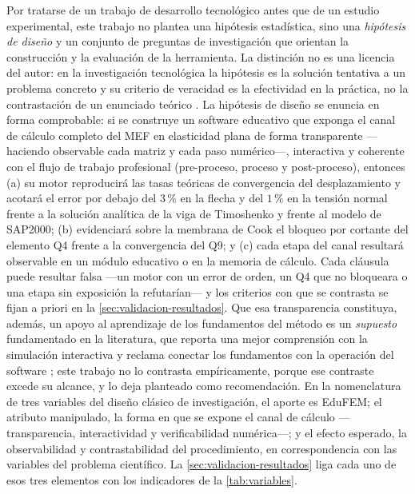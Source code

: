 Por tratarse de un trabajo de desarrollo tecnológico antes que de un estudio experimental, este trabajo no plantea una hipótesis estadística, sino una \emph{hipótesis de diseño} y un conjunto de preguntas de investigación que orientan la construcción y la evaluación de la herramienta. La distinción no es una licencia del autor: en la investigación tecnológica la hipótesis es la solución tentativa a un problema concreto y su criterio de veracidad es la efectividad en la práctica, no la contrastación de un enunciado teórico \autocite[p.~85]{garciacordoba2005tecnologica}. La hipótesis de diseño se enuncia en forma comprobable: si se construye un software educativo que exponga el canal de cálculo completo del MEF en elasticidad plana de forma transparente —haciendo observable cada matriz y cada paso numérico—, interactiva y coherente con el flujo de trabajo profesional (pre-proceso, proceso y post-proceso), entonces (a) su motor reproducirá las tasas teóricas de convergencia del desplazamiento y acotará el error por debajo del $3\,\%$ en la flecha y del $1\,\%$ en la tensión normal frente a la solución analítica de la viga de Timoshenko y frente al modelo de SAP2000; (b) evidenciará sobre la membrana de Cook el bloqueo por cortante del elemento Q4 frente a la convergencia del Q9; y (c) cada etapa del canal resultará observable en un módulo educativo o en la memoria de cálculo. Cada cláusula puede resultar falsa —un motor con un error de orden, un Q4 que no bloqueara o una etapa sin exposición la refutarían— y los criterios con que se contrasta se fijan a priori en la \autoref{sec:validacion-resultados}. Que esa transparencia constituya, además, un apoyo al aprendizaje de los fundamentos del método es un \emph{supuesto} fundamentado en la literatura, que reporta una mejor comprensión con la simulación interactiva y reclama conectar los fundamentos con la operación del software \autocites[p.~157]{lee2015interactive}[p.~1168]{perezsantiago2023fem}; este trabajo no lo contrasta empíricamente, porque ese contraste excede su alcance, y lo deja planteado como recomendación. En la nomenclatura de tres variables del diseño clásico de investigación, el aporte es EduFEM; el atributo manipulado, la forma en que se expone el canal de cálculo —transparencia, interactividad y verificabilidad numérica—; y el efecto esperado, la observabilidad y contrastabilidad del procedimiento, en correspondencia con las variables del problema científico. La \autoref{sec:validacion-resultados} liga cada uno de esos tres elementos con los indicadores de la \autoref{tab:variables}.

